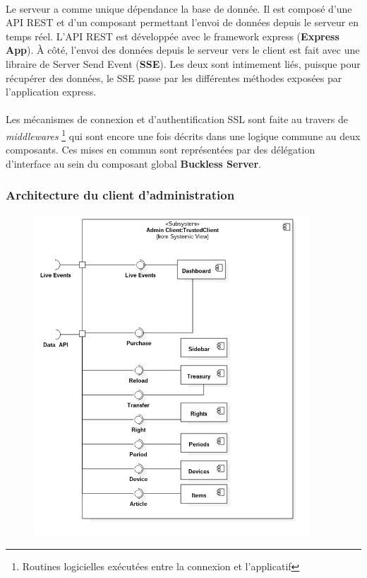         \paragraph{}
            Le serveur a comme unique dépendance la base de donnée. Il est composé d'une API REST
            et d'un composant permettant l'envoi de données depuis le serveur en temps réel.
            L'API REST est développée avec le framework express (\textbf{Express App}). À côté,
            l'envoi des données depuis le serveur vers le client  est fait avec une libraire de Server Send Event (\textbf{SSE}).
            Les deux sont intimement liés, puisque pour récupérer des données, le SSE passe par les différentes méthodes
            exposées par l'application express.

        \paragraph{}
            Les mécanismes de connexion et d'authentification SSL sont faite au travers de \textit{middlewares}
            \footnote{Routines logicielles exécutées entre la connexion et l'applicatif} qui sont encore
            une fois décrits dans une logique commune au deux composants. Ces mises en commun sont représentées
            par des délégation d'interface au sein du composant global \textbf{Buckless Server}.

    \newpage
    \subsubsection{Architecture du client d'administration}
        \begin{figure}[h]
            \centering
            \includegraphics[height=12cm]{./assets/UML/admin_client.png}
        \end{figure}

